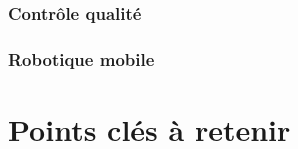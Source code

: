 \begin{bibliographysection}
\section{Contrôle qualité}
\localized
\section{Robotique mobile}
\localized
\localized
\localized

\part{Points clés à retenir}
\localized
\localized

\appendix

\localized
\localized
\localized
\localized
\localized

\end{bibliographysection}

\endinput
